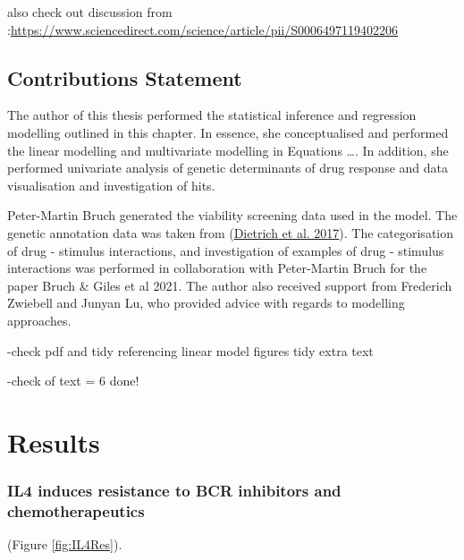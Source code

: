 \documentclass[11pt, a4paper, twosided]{book}
\begin{document}
also check out discussion from :\url{https://www.sciencedirect.com/science/article/pii/S0006497119402206}

\hypertarget{contributions-statement-1}{%
\section{Contributions Statement}\label{contributions-statement-1}}

The author of this thesis performed the statistical inference and regression modelling outlined in this chapter. In essence, she conceptualised and performed the linear modelling and multivariate modelling in Equations \ldots. In addition, she performed univariate analysis of genetic determinants of drug response and data visualisation and investigation of hits.

Peter-Martin Bruch generated the viability screening data used in the model. The genetic annotation data was taken from (\protect\hyperlink{ref-JCIpaper}{Dietrich et al. 2017}). The categorisation of drug - stimulus interactions, and investigation of examples of drug - stimulus interactions was performed in collaboration with Peter-Martin Bruch for the paper Bruch \& Giles et al 2021. The author also received support from Frederich Zwiebell and Junyan Lu, who provided advice with regards to modelling approaches.

-check pdf and tidy
referencing
linear model
figures tidy
extra text

-check of text
= 6 done!

\hypertarget{chapter7}{%
\chapter{Results}\label{chapter7}}

\hypertarget{IL4resistance}{%
\subsection{IL4 induces resistance to BCR inhibitors and chemotherapeutics}\label{IL4resistance}}

(Figure \ref{fig:IL4Res}).
\end{document}
